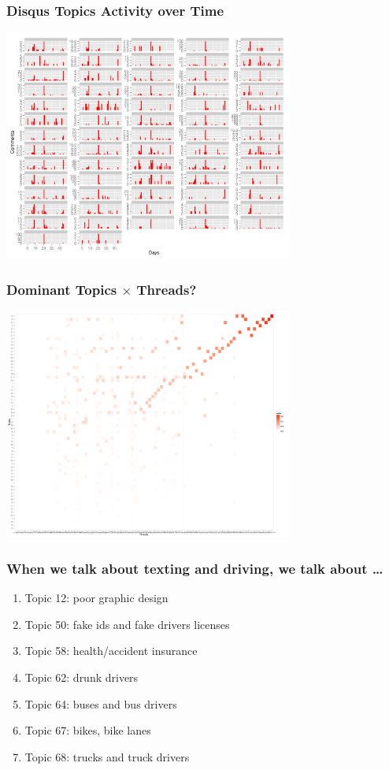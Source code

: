 \documentclass{beamer}
\begin{document}
\begin{frame}\frametitle{Disqus Topics Activity over Time}
  \begin{center}
    \includegraphics[width=9.5cm]{./imgs/timebycluster.pdf}
  \end{center}
\end{frame}

\begin{frame}\frametitle{Dominant Topics $\times$ Threads?}
  \begin{center}
    \includegraphics[width=9.5cm]{./imgs/gg_heat.pdf}
  \end{center}
\end{frame}

\begin{frame}\frametitle{When we talk about texting and driving, we talk about \ldots}
\begin{center}
{\Large 
\begin{enumerate}
\item Topic 12: poor graphic design
\item Topic 50: fake ids and fake drivers licenses
\item Topic 58: health/accident insurance
\item Topic 62: drunk drivers
\item Topic 64: buses and bus drivers
\item Topic 67: bikes, bike lanes
\item Topic 68: trucks and truck drivers
\end{enumerate}
}
\end{center}
\end{frame}
\end{document}
